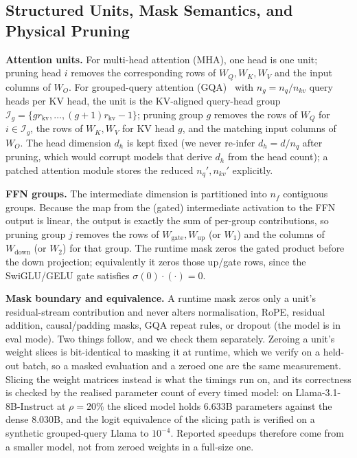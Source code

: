 \subsection{Structured Units, Mask Semantics, and Physical Pruning}

\label{app:units}

\textbf{Attention units.} For multi-head attention (MHA), one head is one unit; pruning head $i$
removes the corresponding rows of $W_Q,W_K,W_V$ and the input columns of $W_O$. For grouped-query
attention (GQA)~\citep{ainslie2023gqa} with $n_g=n_q/n_{kv}$ query heads per KV head, the unit is the
KV-aligned query-head group $\mathcal{I}_g=\{g r_{\mathrm{kv}},\dots,(g{+}1)r_{\mathrm{kv}}{-}1\}$; pruning group $g$ removes the
rows of $W_Q$ for $i\in\mathcal{I}_g$, the rows of $W_K,W_V$ for KV head $g$, and the matching input
columns of $W_O$. The head dimension $d_h$ is kept fixed (we never re-infer $d_h=d/n_q$ after pruning,
which would corrupt models that derive $d_h$ from the head count); a patched attention module stores
the reduced $n_q',n_{kv}'$ explicitly.

\textbf{FFN groups.} The intermediate dimension is partitioned into $n_f$ contiguous groups. Because
the map from the (gated) intermediate activation to the FFN output is linear, the output is exactly the
sum of per-group contributions, so pruning group $j$ removes the rows of $W_{\text{gate}},W_{\text{up}}$
(or $W_1$) and the columns of $W_{\text{down}}$ (or $W_2$) for that group. The runtime mask zeros the
gated product before the down projection; equivalently it zeros those up/gate rows, since the
SwiGLU/GELU gate satisfies $\sigma(0)\cdot(\cdot)=0$.

\textbf{Mask boundary and equivalence.} A runtime mask zeros only a unit's residual-stream
contribution and never alters normalisation, RoPE, residual addition, causal/padding masks, GQA repeat
rules, or dropout (the model is in eval mode). Two things follow, and we check them
separately. Zeroing a unit's weight slices is bit-identical to masking it at runtime, which we verify
on a held-out batch, so a masked evaluation and a zeroed one are the same measurement. Slicing the
weight matrices instead is what the timings run on, and its correctness is checked by the realised
parameter count of every timed model: on Llama-3.1-8B-Instruct at $\rho{=}20\%$ the sliced model holds
$6.633$B parameters against the dense $8.030$B, and the logit equivalence of the slicing path is
verified on a synthetic grouped-query Llama to $10^{-4}$. Reported speedups therefore come from a
smaller model, not from zeroed weights in a full-size one.
